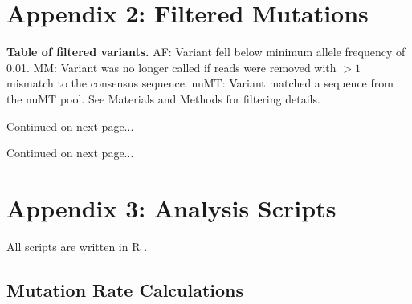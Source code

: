 \documentclass[12pt,twoside]{reedthesis}
\begin{document}
\section{Appendix 2: Filtered Mutations}
\begin{table}[h!]
    \begin{center}
        \caption[Table of filtered variants]{\textbf{Table of filtered variants.} AF: Variant fell below minimum allele frequency of 0.01. MM: Variant was no longer called if reads were removed with $>1$ mismatch to the consensus sequence. nuMT: Variant matched a sequence from the nuMT pool. See Materials and Methods for filtering details.}
        \label{filterTable}
    \end{center}
\end{table}

Continued on next page...
\begin{table}[h!]
    \begin{center}
        \label{filterTable2}
    \end{center}
\end{table}

Continued on next page...
\begin{table}[h!]
    \begin{center}
        \label{filterTable3}
    \end{center}
\end{table}
\section{Appendix 3: Analysis Scripts}
All scripts are written in R \citep{r_core_team_r:_2014}.
\vspace{-20mm}
\subsection{Mutation Rate Calculations}
\vspace{-20mm}
\end{document}
